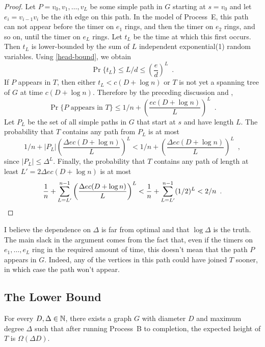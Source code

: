 \documentclass{patmorin}
\begin{document}
\begin{proof}
  Let $P=v_0,v_1,\ldots,v_L$ be some simple path in $G$ starting at
  $s=v_0$ and let $e_i=v_{i-1}v_i$ be the $i$th edge on this path.
  In the model of Process~E, this path can not appear before the timer
  on $e_1$ rings, and then the timer on $e_2$ rings, and so on, until the
  timer on $e_L$ rings.  Let $t_L$ be the time at which this first occurs.
  Then $t_L$ is lower-bounded by the sum of $L$ independent exponential(1)
  random variables.  Using \eqref{head-bound}, we obtain
  \[
      \Pr\{t_L\} \le L/d \le \left(\frac{e}{d}\right)^L \enspace .
  \]
  If $P$ appears in $T$, then either $t_L < c(D+\log n)$ or $T$ is not
  yet a spanning tree of $G$ at time $c(D+\log n)$.  
  Therefore by the preceding discussion and , 
  \[
      \Pr\{\text{$P$ appears in $T$}\} \le 1/n 
        + \left(\frac{ec(D+\log n)}{L}\right)^L \enspace .
  \]
  Let $P_L$ be the set of all simple paths in $G$ that start at $s$ and have length $L$.  The probability that $T$ contains any path from $P_L$ is at most
  \[
      1/n + |P_L|\left(\frac{\Delta ec(D+\log n)}{L}\right)^L 
      < 1/n + \left(\frac{\Delta ec(D+\log n)}{L}\right)^L \enspace ,
  \]
  since $|P_L|\le \Delta^L$.
  Finally, the probability that $T$ contains any path of length at least
  $L'=2\Delta ec(D+\log n)$ is at most
  \[
     \frac{1}{n}+\sum_{L=L'}^{n-1} \left(\frac{\Delta ec(D+\log n)}{L}\right)^L <  \frac{1}{n}+\sum_{L=L'}^{n-1} (1/2)^L < 2/n \enspace . \qedhere
  \]
\end{proof}

I believe the dependence on $\Delta$ is far from optimal and that $\log\Delta$ is the truth.  The main slack in the argument comes from the fact that, even if the timers on $e_1,\ldots,e_L$ ring in the required amount of time, this doesn't mean that the path $P$ appears in $G$.  Indeed, any of the vertices in this path could have joined $T$ sooner, in which case the path won't appear. 


\subsection{The Lower Bound}

\begin{lem}
  For every $D,\Delta\in\mathbb{N}$, there exists a graph $G$ with diameter
  $D$ and maximum degree $\Delta$ such that after running Process~B
  to completion, the expected height of $T$ is $\Omega(\Delta D)$.
\end{lem}
\end{document}
